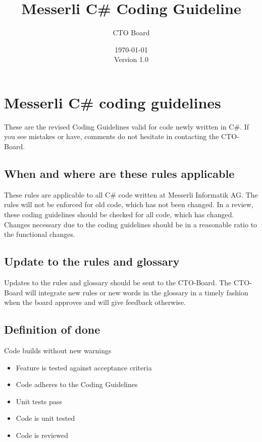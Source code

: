 \documentclass[11pt,a4paper]{article}
\begin{document}
\title{Messerli C\# Coding Guideline}
\author{CTO Board}
\date{\today\\Version 1.0}
\maketitle

\inlinetoc

\newpage

\section{Messerli C\# coding guidelines}

These are the revised Coding Guidelines valid for code newly written in C\#.
If you see mistakes or have, comments do not hesitate in contacting the CTO-Board.

\subsection{When and where are these rules applicable}

These rules are applicable to all C\# code written at Messerli Informatik AG. 
The rules will not be enforced for old code, which has not been changed.
In a review, these coding guidelines should be checked for all code, which has changed.
Changes necessary due to the coding guidelines should be in a reasonable ratio to the functional changes.

\subsection{Update to the rules and glossary}

Updates to the rules and glossary should be sent to the CTO-Board. The CTO-Board will integrate new rules or new words in the glossary in a timely fashion when the board approves and will give feedback otherwise.

\subsection{Definition of done}

Code builds without new warnings

\begin{itemize}[itemsep=0pt]
  \item Feature is tested against acceptance criteria
  \item Code adheres to the Coding Guidelines
  \item Unit tests pass
  \item Code is unit tested
  \item Code is reviewed
\end{itemize}
\end{document}
